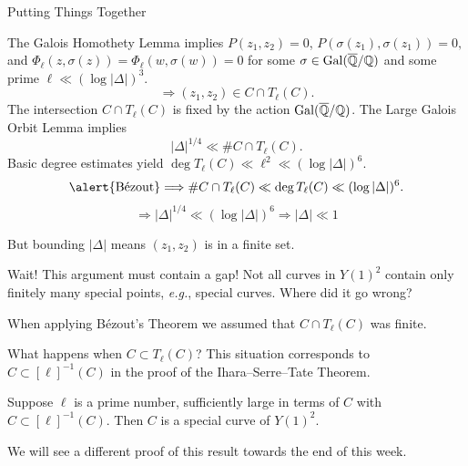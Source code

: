 \documentclass{beamer}
\begin{document}
\begin{frame}{Putting Things Together}
  
  The \alert{Galois Homothety Lemma} implies $P(z_1,z_2)=0$, $P(\sigma(z_1),\sigma(z_1))=0,$
  and $\Phi_\ell(z,\sigma(z))=\Phi_\ell(w,\sigma(w))=0$ for some
  $\sigma\in\mathrm{Gal}({\overline{\mathbb{Q}}}/{\mathbb{Q}})$ and some prime
  $\ell \ll (\log|\Delta|)^3$. 
  \begin{equation*}
    \Longrightarrow (z_1,z_2) \in C \cap T_\ell(C).
  \end{equation*}
  The
  intersection $C\cap T_\ell(C)$ is {fixed} by the action
  $\mathrm{Gal}({\overline{\mathbb{Q}}}/{\mathbb{Q}})$. The \alert{Large Galois Orbit Lemma} implies
  \begin{equation}
      |\Delta|^{1/4} \ll \# C\cap
    T_\ell(C).
  \end{equation}
  Basic degree estimates  yield $\deg T_\ell(C) \ll \ell^2 \ll (\log|\Delta|)^6$.
  \begin{equation*}
    \text{\alert{B\'ezout}} \Longrightarrow \# C\cap T_\ell(C) \ll \deg
    T_{\ell}(C)\ll (\log|\Delta|)^6.
  \end{equation*}
  \begin{equation*}
    \Longrightarrow
    |\Delta|^{1/4} \ll (\log |\Delta|)^6 \Longrightarrow |\Delta|\ll 1
  \end{equation*}

  But bounding $|\Delta|$ means $(z_1,z_2)$ is in a finite set. 
\end{frame}

\begin{frame}{Wait!}
  This argument must contain a \alert{gap}! Not all curves in $Y(1)^2$
  contain only finitely many special points, \textit{e.g.}, special
  curves.  Where did it go wrong?

  When applying B\'ezout's Theorem we assumed that $C\cap T_\ell(C)$
  was finite.

  What happens when $C\subset T_\ell(C)$? This situation corresponds
  to $C\subset [\ell]^{-1}(C)$ in the proof of the
  Ihara--Serre--Tate Theorem. 

  \begin{theorem}[Edixhoven]
    Suppose $\ell$ is a prime number, sufficiently large in terms of
    $C$ with $C\subset [\ell]^{-1}(C)$. Then $C$ is a special curve of
    $Y(1)^2$. 
  \end{theorem}

  We will see a different proof of this result towards the end of this
  week.   
\end{frame}
\end{document}
